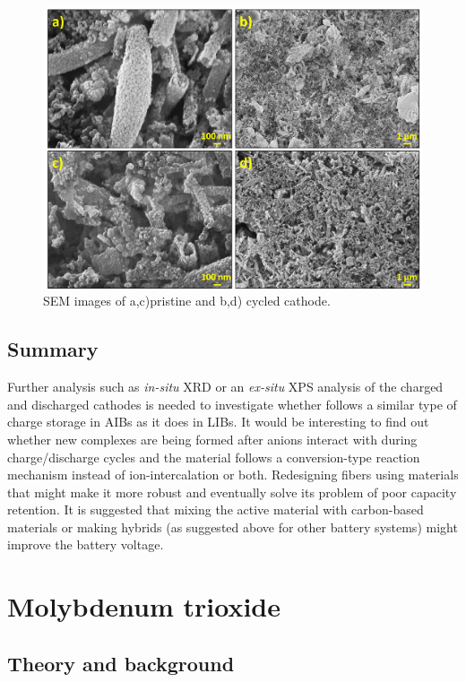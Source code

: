 \begin{figure}[th!]
\centering
\includegraphics[width=\textwidth]{Figures/chap6fig/SnO2SEM}
\caption{SEM images of a,c)pristine and b,d) cycled  cathode.}
\label{Figures/chap6fig:SnO2SEM}
\end{figure}
\subsection{Summary}
Further analysis such as \textit{in-situ} XRD or an \textit{ex-situ} XPS analysis of the charged and discharged cathodes is needed to investigate whether  follows a similar type of charge storage in AIBs as it does in LIBs. It would be interesting to find out whether new complexes are being formed after  anions interact with  during charge/discharge cycles and the material follows a conversion-type reaction mechanism instead of ion-intercalation or both. Redesigning  fibers using materials that might make it more robust and eventually solve its problem of poor capacity retention. It is suggested that mixing the active material with carbon-based materials or making  hybrids (as suggested above for other battery systems) might improve the battery voltage. 


\section{Molybdenum trioxide}
\subsection{Theory and background}

